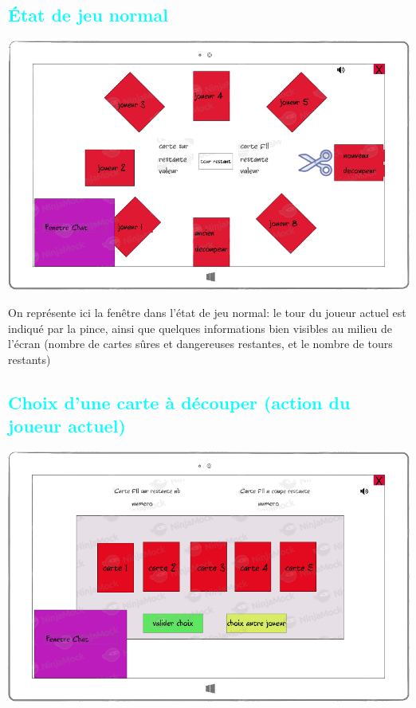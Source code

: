 \documentclass[a4paper]{article}
\let\oldsubsection\subsection
\renewcommand{\subsection}[1]{\textcolor{cyan}{\oldsubsection{#1}}}
\begin{document}
\subsection{État de jeu normal}

\begin{center}
    \includegraphics[scale=2]{img/ecran_partie_quand_joueur_pas_choix.png}
\end{center}

On représente ici la fenêtre dans l'état de jeu normal: le tour du joueur actuel est indiqué par la pince, ainsi que quelques informations bien visibles au milieu de l'écran (nombre de cartes sûres et dangereuses restantes, et le nombre de tours restants)

\subsection{Choix d'une carte à découper (action du joueur actuel)}

\begin{center}
    \includegraphics[scale=2]{img/choix_carte_a_defausser.png}
\end{center}
\end{document}
